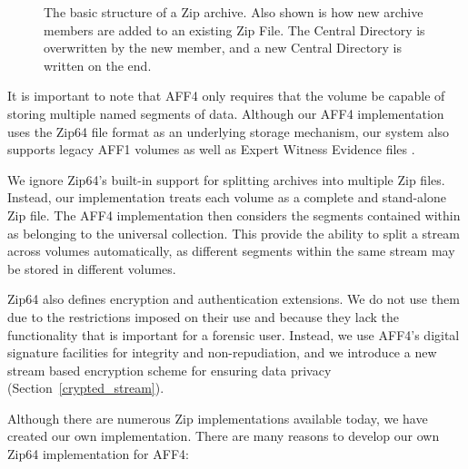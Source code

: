 \documentclass[10pt, conference]{IEEEtran}
\begin{document}
\begin{figure}[tbp]
  \begin{center}
  \mbox{\columnwidth {}}

  \caption{The basic structure of a Zip archive. Also shown is how new
  archive members are added to an existing Zip File. The Central
  Directory is overwritten by the new member, and a new Central
  Directory is written on the end.  }

  \label{zip_structure}
  \end{center}
\end{figure}

It is important to note that AFF4 only requires that the volume be
capable of storing multiple named segments of data. Although our AFF4
implementation uses the Zip64 file format as an underlying storage
mechanism, our system also supports legacy AFF1 volumes as well as
Expert Witness Evidence files \cite{libewf}.

We ignore Zip64's built-in support for splitting archives into
multiple Zip files. Instead, our implementation treats each volume as
a complete and stand-alone Zip file. The AFF4 implementation then
considers the segments contained within as belonging to the universal
collection. This provide the ability to split a stream across volumes
automatically, as different segments within the same stream may be
stored in different volumes.

Zip64 also defines encryption and authentication extensions. We do not
use them due to the restrictions imposed on their use and because they
lack the functionality that is important for a forensic user. Instead,
we use AFF4's digital signature facilities for integrity and
non-repudiation, and we introduce a new stream based encryption scheme
for ensuring data privacy (Section~\ref{crypted_stream}).

Although there are numerous Zip implementations available today, we
have created our own implementation. There are many reasons to develop
our own Zip64 implementation for AFF4:
\end{document}

